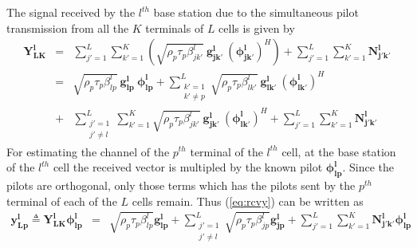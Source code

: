 \documentclass[10pt, a4paper, twoside,fleqn]{article}
\begin{document}
The signal received by the $l^{th}$ base station due to the simultaneous pilot transmission from  all the $K$ terminals of $L$ cells is given by
\begin{eqnarray}\label{eq:rcvy}
	\mathbf{Y_{LK}^{l}} &=& \sum_{j'=1}^{L} \sum_{k'=1}^{K} (\sqrt{\rho_p \tau_p \beta_{jk'}^{l}} \ \mathbf{g_{jk'}^{l}} \ (\mathbf{\phi_{jk'}^{l}})^H)
				+ \sum_{j'=1}^{L} \sum_{k'=1}^{K}\mathbf{N_{j'k'}^{l}} \nonumber \\
			    &=&\sqrt{\rho_p \tau_p \beta_{lp}^{l}} \ \mathbf{g_{lp}^{l}} \ \mathbf{\phi_{lp}^{l}}
			     + \sum_{\substack{k'=1 \\ k' \neq p}}^{L} \sqrt{\rho_p \tau_p \beta_{lk'}^{l}} \ \mathbf{g_{lk'}^{l}} \ (\mathbf{\phi_{lk'}^{l}}) ^H \nonumber \\
			    &+&\sum_{\substack{j'=1 \\ j' \neq l}}^{L} \sum_{k'=1}^{K} \sqrt{\rho_p \tau_p \beta_{jk'}^{l}} \ \mathbf{g_{jk'}^{l}} \ (\mathbf{\phi_{lk'}^{l}})^H 
			     +  \sum_{j'=1}^{L} \sum_{k'=1}^{K}\mathbf{N_{j'k'}^{l}}
\end{eqnarray}
For estimating the channel of the $p^{th}$ terminal of the $l^{th}$ cell, at the base station of the $l^{th}$ cell the received vector is multipled by the known pilot $\mathbf{\phi_{lp}^{l}}$. Since the pilots are orthogonal, only those terms which has the pilots sent by the $p^{th}$ terminal of each of the $L$ cells remain. Thus (\ref{eq:rcvy}) can be written as
\begin{eqnarray}
	\mathbf{y_{Lp}^{l}} \triangleq \mathbf{Y_{LK}^{l}} \mathbf{\phi_{lp}^{l}} 
                                &=&    \sqrt{\rho_p\tau_p\beta_{lp}^{l}}\mathbf{g_{lp}^{l}} 
                                 +     \sum_{\substack{j'=1 \\ j' \neq l}}^{L} \sqrt{\rho_p\tau_p\beta_{jp}^{l}}\mathbf{g_{jp}^{l}}
				 +     \sum_{j'=1}^{L} \sum_{k'=1}^{K}\mathbf{N_{j'k'}^{l}}\mathbf{\phi_{lp}^{l}}
\end{eqnarray}
\end{document}
